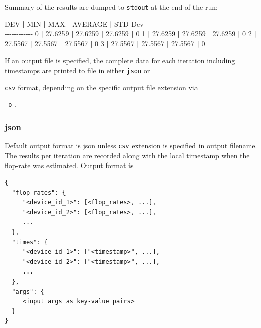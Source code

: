 \documentclass[
]{article}
\let\oldtexttt\texttt
\renewcommand{\texttt}[1]{
  \colorbox{Light}{\oldtexttt{#1}}
}
\newenvironment{Shaded}{}{}
\newcommand{\ExtensionTok}[1]{#1}
\newcommand{\KeywordTok}[1]{\textcolor[rgb]{0.00,0.44,0.13}{\textbf{#1}}}
\newcommand{\NormalTok}[1]{#1}
\begin{document}
Summary of the results are dumped to \texttt{stdout} at the end of the
run:

\begin{Shaded}
\begin{Highlighting}[]
  \ExtensionTok{DEV} \KeywordTok{|}        \ExtensionTok{MIN} \KeywordTok{|}        \ExtensionTok{MAX} \KeywordTok{|}    \ExtensionTok{AVERAGE} \KeywordTok{|}    \ExtensionTok{STD}\NormalTok{ Dev}
\ExtensionTok{{-}{-}{-}{-}{-}{-}{-}{-}{-}{-}{-}{-}{-}{-}{-}{-}{-}{-}{-}{-}{-}{-}{-}{-}{-}{-}{-}{-}{-}{-}{-}{-}{-}{-}{-}{-}{-}{-}{-}{-}{-}{-}{-}{-}{-}{-}{-}{-}{-}{-}{-}{-}{-}{-}{-}{-}{-}{-}{-}}
    \ExtensionTok{0} \KeywordTok{|}    \ExtensionTok{27.6259} \KeywordTok{|}    \ExtensionTok{27.6259} \KeywordTok{|}    \ExtensionTok{27.6259} \KeywordTok{|}          \ExtensionTok{0}
    \ExtensionTok{1} \KeywordTok{|}    \ExtensionTok{27.6259} \KeywordTok{|}    \ExtensionTok{27.6259} \KeywordTok{|}    \ExtensionTok{27.6259} \KeywordTok{|}          \ExtensionTok{0}
    \ExtensionTok{2} \KeywordTok{|}    \ExtensionTok{27.5567} \KeywordTok{|}    \ExtensionTok{27.5567} \KeywordTok{|}    \ExtensionTok{27.5567} \KeywordTok{|}          \ExtensionTok{0}
    \ExtensionTok{3} \KeywordTok{|}    \ExtensionTok{27.5567} \KeywordTok{|}    \ExtensionTok{27.5567} \KeywordTok{|}    \ExtensionTok{27.5567} \KeywordTok{|}          \ExtensionTok{0}
\end{Highlighting}
\end{Shaded}

If an output file is specified, the complete data for each iteration
including timestamps are printed to file in either \texttt{json} or
\texttt{csv} format, depending on the specific output file extension via
\texttt{-o}.

\hypertarget{json}{%
\subsubsection{json}\label{json}}

Default output format is json unless \texttt{csv} extension is specified
in output filename. The results per iteration are recorded along with
the local timestamp when the flop-rate was estimated. Output format is

\begin{verbatim}
{
  "flop_rates": {
     "<device_id_1>": [<flop_rates>, ...],
     "<device_id_2>": [<flop_rates>, ...],
     ...
  },
  "times": {
     "<device_id_1>": ["<timestamp>", ...],
     "<device_id_2>": ["<timestamp>", ...],
     ...
  },
  "args": {
     <input args as key-value pairs>
  }
}
\end{verbatim}
\end{document}
